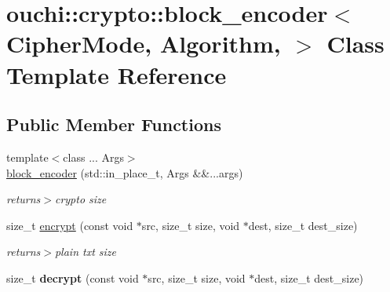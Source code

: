 \hypertarget{classouchi_1_1crypto_1_1block__encoder}{}\section{ouchi\+::crypto\+::block\+\_\+encoder$<$ Cipher\+Mode, Algorithm, $>$ Class Template Reference}
\label{classouchi_1_1crypto_1_1block__encoder}
\subsection*{Public Member Functions}
\begin{DoxyCompactItemize}
\item 
\mbox{\label{classouchi_1_1crypto_1_1block__encoder_a76296319b460fe188134fa707302b530}} 
{\footnotesize template$<$class ... Args$>$ }\\\mbox{\hyperlink{classouchi_1_1crypto_1_1block__encoder_a76296319b460fe188134fa707302b530}{block\+\_\+encoder}} (std\+::in\+\_\+place\+\_\+t, Args \&\&...args)
\begin{DoxyCompactList}\small\item\em returns$>$crypto size\end{DoxyCompactList}\item 
\mbox{\label{classouchi_1_1crypto_1_1block__encoder_ad42b8354e56006a17ea40963dd53dc44}} 
size\+\_\+t \mbox{\hyperlink{classouchi_1_1crypto_1_1block__encoder_ad42b8354e56006a17ea40963dd53dc44}{encrypt}} (const void $\ast$src, size\+\_\+t size, void $\ast$dest, size\+\_\+t dest\+\_\+size)
\begin{DoxyCompactList}\small\item\em returns$>$plain txt size\end{DoxyCompactList}\item 
\mbox{\label{classouchi_1_1crypto_1_1block__encoder_a83c4655202996f1a2cdbf1a4f8d964ed}} 
size\+\_\+t {\bfseries decrypt} (const void $\ast$src, size\+\_\+t size, void $\ast$dest, size\+\_\+t dest\+\_\+size)
\item 
\mbox{\label{classouchi_1_1crypto_1_1block__encoder_a6db3aa2fb1fd0936a66cdb0eeb19387b}} 

\end{DoxyCompactItemize}
